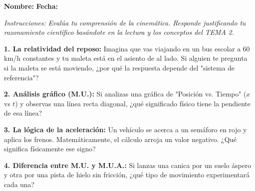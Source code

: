 \documentclass[12pt, letterpaper]{article}
\newif\ifshowanswers
\newcommand{\respAbierta}[2][3cm]{
	\ifshowanswers
	\par\vspace{0.2cm}
	\textbf{\textcolor{blue}{Respuesta Esperada:}} \textcolor{blue}{#2}
	\par\vspace{0.2cm}
	\else
	\par\vspace{#1} %
	\fi
}
\begin{document}
	\vspace{0.3cm}
	\noindent \textbf{Nombre:} \underline{\hspace{8cm}} \hspace{1cm}\textbf{Fecha:} \underline{\hspace{3cm}}
	
	\vspace{0.3cm}
	\begin{tcolorbox}[colback=gray!10!white, colframe=black, arc=1mm]
		\textit{Instrucciones: Evalúa tu comprensión de la cinemática. Responde justificando tu razonamiento científico basándote en la lectura y los conceptos del TEMA 2.}
	\end{tcolorbox}
	
	\vspace{0.3cm}
	\noindent \textbf{1. La relatividad del reposo:} Imagina que vas viajando en un bus escolar a 60 km/h constantes y tu maleta está en el asiento de al lado. Si alguien te pregunta si la maleta se está moviendo, ¿por qué la respuesta depende del "sistema de referencia"?
	\respAbierta[3.5cm]{La afirmación de movimiento es relativa. Respecto al estudiante (sistema de referencia interno), la maleta está en reposo porque no cambia su posición frente a él. Sin embargo, para un observador en la calle (externo), tanto el bus como la maleta se mueven a 60 km/h.}
	
	\vspace{0.2cm}
	\noindent \textbf{2. Análisis gráfico (M.U.):} Si analizas una gráfica de "Posición vs. Tiempo" ($x$ vs $t$) y observas una línea recta diagonal, ¿qué significado físico tiene la pendiente de esa línea?
	\respAbierta[3cm]{La pendiente en una gráfica de posición vs. tiempo representa la \textbf{velocidad} del objeto. Al ser una línea recta, la pendiente es constante, lo que indica un Movimiento Uniforme (M.U.).}
	
	\vspace{0.2cm}
	\noindent \textbf{3. La lógica de la aceleración:} Un vehículo se acerca a un semáforo en rojo y aplica los frenos. Matemáticamente, el cálculo arroja un valor negativo. ¿Qué significa físicamente ese signo?
	\respAbierta[3cm]{El signo negativo indica una desaceleración; es decir, la velocidad final es menor que la inicial. Físicamente significa que el vehículo está perdiendo velocidad en una proporción constante hasta detenerse.}
	
	\vspace{0.2cm}
	\noindent \textbf{4. Diferencia entre M.U. y M.U.A.:} Si lanzas una canica por un suelo áspero y otra por una pista de hielo sin fricción, ¿qué tipo de movimiento experimentará cada una?
	\respAbierta[3.5cm]{En el suelo áspero, la fricción genera una desaceleración constante (M.U.A. negativo). En la pista de hielo perfectamente lisa, al no haber fuerzas que frenen el objeto, este mantendrá su velocidad constante (M.U.).}
	
\end{document}

